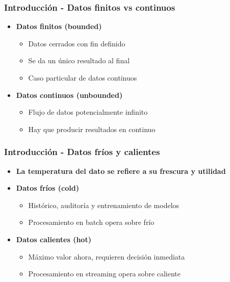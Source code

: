 \documentclass[aspectratio=169]{beamer}
\begin{document}
\begin{frame}
\frametitle{Introducción - Datos finitos vs continuos}
	\begin{itemize}
		\item \textbf{Datos finitos (bounded)}
		\begin{itemize}
			\item Datos cerrados con fin definido
			\item Se da un único resultado al final
			\item Caso particular de datos continuos
		\end{itemize}

		\vspace{1em}

    \item \textbf{Datos continuos (unbounded)}
		\begin{itemize}
			\item Flujo de datos potencialmente infinito
			\item Hay que producir resultados en continuo
		\end{itemize}
	\end{itemize}
\end{frame}

\begin{frame}
\frametitle{Introducción - Datos fríos y calientes}
	\begin{itemize}
		\item \textbf{La temperatura del dato se refiere a su frescura y utilidad}

		\vspace{1em}

    \item \textbf{Datos fríos (cold)}
		\begin{itemize}
			\item Histórico, auditoría y entrenamiento de modelos
			\item Procesamiento en batch opera sobre frío
		\end{itemize}

		\vspace{1em}

    \item \textbf{Datos calientes (hot)}
		\begin{itemize}
			\item Máximo valor ahora, requieren decisión inmediata
			\item Procesamiento en streaming opera sobre caliente
		\end{itemize}

	\end{itemize}
\end{frame}
\end{document}
